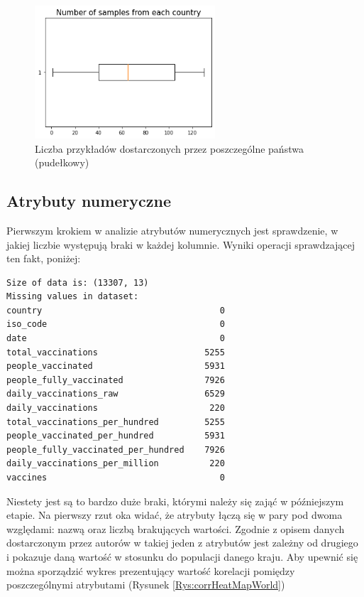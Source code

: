 \documentclass[12pt, oneside]{article}
\begin{document}
\begin{figure}[h]
\centering
\includegraphics[width=0.6\textwidth]{../img/boxplot_of_samples.png} 
\caption{Liczba przykładów dostarczonych przez poszczególne państwa (pudełkowy)}
\label{Rys:boxplotSamples}
\end{figure}






\subsection{Atrybuty numeryczne}

Pierwszym krokiem w analizie atrybutów numerycznych jest sprawdzenie, w jakiej liczbie występują braki w każdej kolumnie. Wyniki operacji sprawdzającej ten fakt, poniżej:

\begin{verbatim}
Size of data is: (13307, 13)
Missing values in dataset: 
country                                   0
iso_code                                  0
date                                      0
total_vaccinations                     5255
people_vaccinated                      5931
people_fully_vaccinated                7926
daily_vaccinations_raw                 6529
daily_vaccinations                      220
total_vaccinations_per_hundred         5255
people_vaccinated_per_hundred          5931
people_fully_vaccinated_per_hundred    7926
daily_vaccinations_per_million          220
vaccines                                  0
\end{verbatim}

Niestety jest są to bardzo duże braki, którymi należy się zająć w późniejszym etapie. Na pierwszy rzut oka widać, że atrybuty łączą się w pary pod dwoma względami: nazwą oraz liczbą brakujących wartości. Zgodnie z opisem danych dostarczonym przez autorów w takiej jeden z atrybutów jest zależny od drugiego i pokazuje daną wartość w stosunku do populacji danego kraju. Aby upewnić się można sporządzić wykres prezentujący wartość korelacji pomiędzy poszczególnymi atrybutami (Rysunek \ref{Rys:corrHeatMapWorld})
\end{document}
